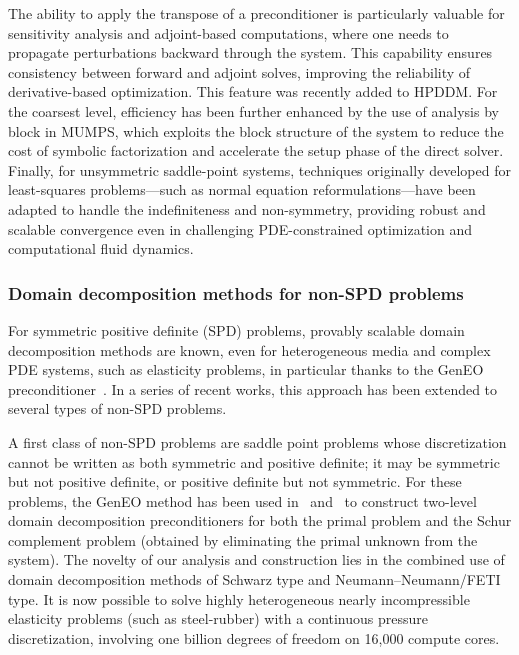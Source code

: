 The ability to apply the transpose of a preconditioner is particularly valuable for sensitivity analysis and adjoint-based computations, where one needs to propagate perturbations backward through the system. This capability ensures consistency between forward and adjoint solves, improving the reliability of derivative-based optimization. This feature was recently added to HPDDM. For the coarsest level, efficiency has been further enhanced by the use of analysis by block in MUMPS, which exploits the block structure of the system to reduce the cost of symbolic factorization and accelerate the setup phase of the direct solver. Finally, for unsymmetric saddle-point systems, techniques originally developed for least-squares problems—such as normal equation reformulations—have been adapted to handle the indefiniteness and non-symmetry, providing robust and scalable convergence even in challenging PDE-constrained optimization and computational fluid dynamics. 
 
 

 \subsubsection{Domain decomposition methods for non-SPD problems}
  \label{sec:wp3:T31:nonSPD}
For symmetric positive definite (SPD) problems, provably scalable domain decomposition methods are known, even for heterogeneous media and complex PDE systems, such as elasticity problems, in particular thanks to the GenEO preconditioner~\cite{Spillane:2014:ASC, Dolean:2015:IDDSiam}. In a series of recent works, this approach has been extended to several types of non-SPD problems.

A first class of non-SPD problems are saddle point problems whose discretization cannot be written as both symmetric and positive definite; it may be symmetric but not positive definite, or positive definite but not symmetric. For these problems, the GenEO method has been used in~\cite{nataf:hal-02343808} and~\cite{brunelli:hal-05123311} to construct two-level domain decomposition preconditioners for both the primal problem and the Schur complement problem (obtained by eliminating the primal unknown from the system). The novelty of our analysis and construction lies in the combined use of domain decomposition methods of Schwarz type and Neumann–Neumann/FETI type. It is now possible to solve highly heterogeneous nearly incompressible elasticity problems (such as steel-rubber) with a continuous pressure discretization, involving one billion degrees of freedom on 16,000 compute cores.

